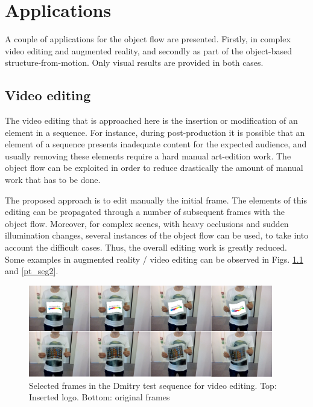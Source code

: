 \chapter{Applications} \label{chap:apps}

A couple of applications for the object flow are presented. Firstly, 
in complex video editing and augmented reality, and secondly as part 
of the object-based structure-from-motion. Only visual results are provided 
in both cases.

\section{Video editing}

The video editing that is approached here is the insertion or modification of 
an element in a sequence. For instance, during post-production it is possible that 
an element of a sequence presents inadequate content for the expected audience, and usually 
removing these elements require a hard manual art-edition work. The object flow 
can be exploited in order to reduce drastically the amount of manual work that has to be done. 

The proposed approach is to edit manually the initial frame. The elements of this editing 
can be propagated  through a number of subsequent frames with the object flow. Moreover, 
for complex scenes, with heavy occlusions and sudden illumination changes, several instances 
of the object flow can be used, to take into account the difficult cases. Thus, the overall editing 
work is greatly reduced. Some examples in augmented reality / video editing can be observed in 
Figs. \ref{pt_seg} and \ref{pt_seg2}.

   \begin{figure}[tpbh]
      \centering
      \includegraphics[width=0.95\textwidth]{../images/videoedition.png}
      \caption{  Selected frames in the Dmitry test sequence for video editing. Top: Inserted logo. Bottom: original frames}
      \label{pt_seg}
   \end{figure}

